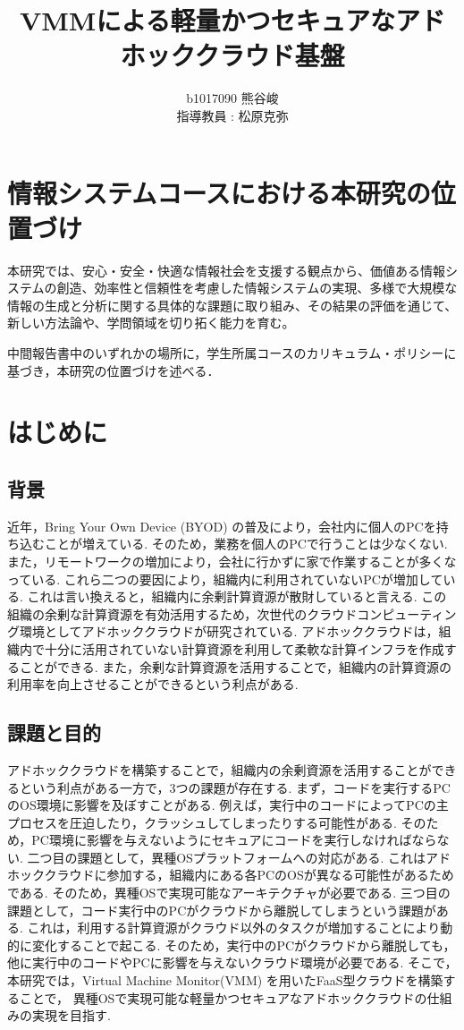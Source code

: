 \documentclass[11pt]{ujarticle} %
\author{%
b1017090 熊谷峻\\指導教員 : 松原克弥
}
\title{VMMによる軽量かつセキュアなアドホッククラウド基盤}
\begin{document}
\maketitle

\section{情報システムコースにおける本研究の位置づけ}
本研究では、安心・安全・快適な情報社会を支援する観点から、価値ある情報システムの創造、効率性と信頼性を考慮した情報システムの実現、多様で大規模な情報の生成と分析に関する具体的な課題に取り組み、その結果の評価を通じて、新しい方法論や、学問領域を切り拓く能力を育む。

中間報告書中のいずれかの場所に，学生所属コースのカリキュラム・ポリシーに基づき，本研究の位置づけを述べる．

\section{はじめに}
\subsection{背景}
近年，Bring Your Own Device (BYOD) の普及により，会社内に個人のPCを持ち込むことが増えている. そのため，業務を個人のPCで行うことは少なくない. また，リモートワークの増加により，会社に行かずに家で作業することが多くなっている. これら二つの要因により，組織内に利用されていないPCが増加している. これは言い換えると，組織内に余剰計算資源が散財していると言える. この組織の余剰な計算資源を有効活用するため，次世代のクラウドコンピューティング環境としてアドホッククラウドが研究されている. アドホッククラウドは，組織内で十分に活用されていない計算資源を利用して柔軟な計算インフラを作成することができる. また，余剰な計算資源を活用することで，組織内の計算資源の利用率を向上させることができるという利点がある.

\subsection{課題と目的}
アドホッククラウドを構築することで，組織内の余剰資源を活用することができるという利点がある一方で，3つの課題が存在する. まず，コードを実行するPCのOS環境に影響を及ぼすことがある. 例えば，実行中のコードによってPCの主プロセスを圧迫したり，クラッシュしてしまったりする可能性がある. そのため，PC環境に影響を与えないようにセキュアにコードを実行しなければならない. 二つ目の課題として，異種OSプラットフォームへの対応がある. これはアドホッククラウドに参加する，組織内にある各PCのOSが異なる可能性があるためである. そのため，異種OSで実現可能なアーキテクチャが必要である. 三つ目の課題として，コード実行中のPCがクラウドから離脱してしまうという課題がある. これは，利用する計算資源がクラウド以外のタスクが増加することにより動的に変化することで起こる. そのため，実行中のPCがクラウドから離脱しても，他に実行中のコードやPCに影響を与えないクラウド環境が必要である. そこで，本研究では，Virtual Machine Monitor(VMM) を用いたFaaS型クラウドを構築することで， 異種OSで実現可能な軽量かつセキュアなアドホッククラウドの仕組みの実現を目指す.
\end{document}
